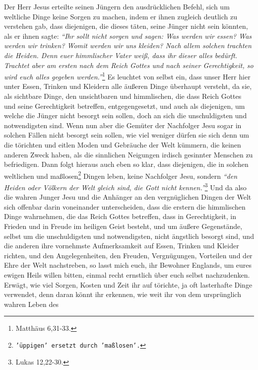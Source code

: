 Der Herr Jesus erteilte seinen Jüngern den ausdrücklichen Befehl, sich um
weltliche Dinge keine Sorgen zu machen, indem er ihnen zugleich deutlich zu
verstehen gab, dass diejenigen, die dieses täten, seine Jünger nicht sein
könnten, als er ihnen sagte:
\textit{"`Ihr sollt nicht sorgen und sagen: Was werden wir
essen? Was werden wir trinken? Womit werden wir uns kleiden? Nach allem solchen
trachten die Heiden. Denn euer himmlischer Vater weiß, dass ihr dieser alles
bedürft. Trachtet aber am ersten nach dem Reich Gottes und nach seiner
Gerechtigkeit, so wird euch alles gegeben werden."'}\footnote{Matthäus 6,31-33.}
Es leuchtet von selbst ein, dass unser Herr hier unter Essen,
Trinken und Kleidern alle äußeren Dinge überhaupt versteht, da sie, als
sichtbare Dinge, den unsichtbaren und himmlischen, die dass Reich
Gottes und
seine Gerechtigkeit betreffen, entgegengesetzt, und auch als diejenigen, um
welche die Jünger nicht besorgt sein sollen, doch an sich die unschuldigsten und
notwendigsten sind. Wenn nun aber die Gemüter der Nachfolger Jesu sogar in
solchen Fällen nicht besorgt sein sollen, wie viel weniger dürfen sie sich denn
um die törichten und eitlen Moden und Gebräuche der Welt kümmern, die keinen
anderen Zweck haben, als die sinnlichen Neigungen irdisch gesinnter Menschen zu
befriedigen. Dann folgt hieraus auch eben so klar, dass diejenigen, die in
solchen weltlichen und maßlosen\footnote{\texttt{'üppigen' ersetzt durch
'maßlosen'.}}
Dingen leben, keine Nachfolger Jesu, sondern
\textit{"`den Heiden oder Völkern der Welt gleich sind, die Gott nicht
kennen."'}\footnote{Lukas 12,22-30.}
Und da also die wahren Junger Jesu und die
Anhänger an den vergnüglichen Dingen der Welt sich offenbar darin voneinander
unterscheiden, dass die erstern die himmlischen Dinge wahrnehmen, die das Reich
Gottes betreffen, dass in Gerechtigkeit, in Frieden und in Freude im heiligen
Geist besteht, und um äußere Gegenstände, selbst um die unschuldigsten und
notwendigsten, nicht ängstlich besorgt sind, und die anderen ihre vornehmste
Aufmerksamkeit auf Essen, Trinken und Kleider richten, und den Angelegenheiten,
den Freuden, Vergnügungen, Vorteilen und der Ehre der Welt nachstreben, so lasst
mich euch, ihr Bewohner Englands, um eures ewigen
Heils willen
bitten, einmal
recht ernstlich über euch selbst nachzudenken. Erwägt, wie viel Sorgen, Kosten
und Zeit ihr auf törichte, ja oft lasterhafte Dinge verwendet, denn daran
könnt ihr erkennen, wie weit ihr von dem ursprünglich wahren Leben des
